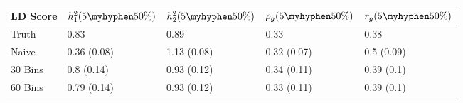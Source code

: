 \begin{table}[ht]
\centering
\begin{tabular}{lllll}
  \hline
LD Score & $h^2_1(5\myhyphen50\%)$ & $h^2_2(5\myhyphen50\%)$ & $\rho_g(5\myhyphen50\%)$ & $r_g(5\myhyphen50\%)$ \\ 
  \hline
Truth & 0.83 & 0.89 & 0.33 & 0.38 \\ 
  Naive & 0.36 (0.08) & 1.13 (0.08) & 0.32 (0.07) & 0.5 (0.09) \\ 
  30 Bins & 0.8 (0.14) & 0.93 (0.12) & 0.34 (0.11) & 0.39 (0.1) \\ 
  60 Bins & 0.79 (0.14) & 0.93 (0.12) & 0.33 (0.11) & 0.39 (0.1) \\ 
   \hline
\end{tabular}
\end{table}
